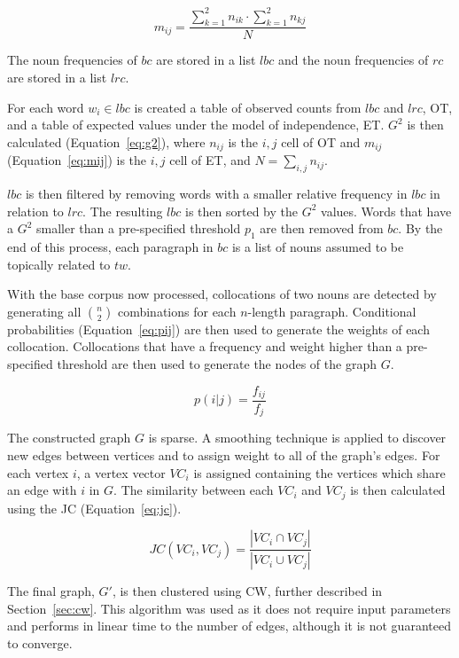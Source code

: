 \begin{equation}\label{eq:mij}
 m_{ij} = \frac{\sum_{k=1}^2 n_{ik} \cdot \sum_{k=1}^2 n_{kj}}
               {N}
\end{equation}

The noun frequencies of $bc$ are stored in a list $lbc$ and the noun
frequencies of $rc$ are stored in a list $lrc$.

For each word $w_i \in lbc$ is created a table of observed counts from $lbc$
and $lrc$, OT, and a table of expected values under the model of independence,
ET. $G^2$ is then calculated (Equation~\ref{eq:g2}), where $n_{ij}$ is the
$i,j$ cell of OT and $m_{ij}$ (Equation~\ref{eq:mij}) is the $i,j$ cell of ET,
and $N = \sum_{i,j} n_{ij}$.

$lbc$ is then filtered by removing words with a smaller relative frequency in
$lbc$ in relation to $lrc$. The resulting $lbc$ is then sorted by the $G^2$
values. Words that have a $G^2$ smaller than a pre-specified threshold $p_1$
are then removed from $bc$. By the end of this process, each paragraph in $bc$
is a list of nouns assumed to be topically related to $tw$.

With the base corpus now processed, collocations of two nouns are detected by
generating all $\binom{n}{2}$ combinations for each $n$-length paragraph.
Conditional probabilities (Equation~\ref{eq:pij}) are then used to generate the
weights of each collocation. Collocations that have a frequency and weight
higher than a pre-specified threshold are then used to generate the nodes of the
graph $G$.

\begin{equation}\label{eq:pij}
 p(i|j) = \frac{f_{ij}}{f_{j}}
\end{equation}

The constructed graph $G$ is sparse. A smoothing technique is applied to
discover new edges between vertices and to assign weight to all of the graph's
edges. For each vertex $i$, a vertex vector $VC_i$ is assigned containing the
vertices which share an edge with $i$ in $G$. The similarity between each $VC_i$
and $VC_j$ is then calculated using the \ac{JC} (Equation~\ref{eq:jc}).

\begin{equation}\label{eq:jc}
 JC(VC_i, VC_j) = \frac{|VC_i \cap VC_j|}
                       {|VC_i \cup VC_j|}
\end{equation}

The final graph, $G'$, is then clustered using \ac{CW}, further described in
Section~\ref{sec:cw}. This algorithm was used as it does not require input
parameters and performs in linear time to the number of edges, although it is
not guaranteed to converge.

